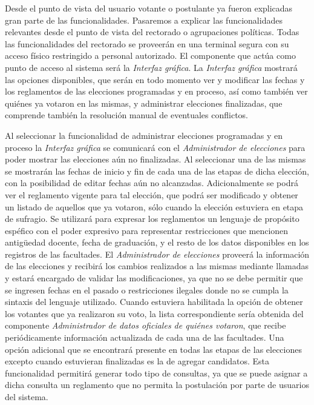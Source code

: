 


Desde el punto de vista del usuario votante o postulante ya fueron explicadas gran parte de las funcionalidades. Pasaremos a explicar las funcionalidades relevantes desde el punto de vista del rectorado o agrupaciones políticas. 
Todas las funcionalidades del rectorado se proveerán en una terminal segura con su acceso físico restringido a personal autorizado. El componente que actúa como punto de acceso al sistema será la \emph{Interfaz gráfica}. 
La \emph{Interfaz gráfica} mostrará las opciones disponibles, que serán en todo momento ver y modificar las fechas y los reglamentos de las elecciones programadas y en proceso, así como también ver quiénes ya votaron en las mismas, y administrar elecciones finalizadas, que comprende también la resolución manual de eventuales conflictos.


Al seleccionar la funcionalidad de administrar elecciones programadas y en proceso la \emph{Interfaz gráfica} se comunicará con el \emph{Administrador de elecciones} para poder mostrar las elecciones aún no finalizadas. Al seleccionar una de las mismas se mostrarán las fechas de inicio y fin de cada una de las etapas de dicha elección, con la posibilidad de editar fechas aún no alcanzadas. Adicionalmente se podrá ver el reglamento vigente para tal elección, que podrá ser modificado y obtener un listado de aquellos que ya votaron, sólo cuando la elección estuviera en etapa de sufragio. Se utilizará para expresar los reglamentos un lenguaje de propósito espéfico con el poder expresivo para representar restricciones que mencionen antig\"uedad docente, fecha de graduación, y el resto de los datos disponibles en los registros de las facultades. El \emph{Administrador de elecciones} proveerá la información de las elecciones y recibirá los cambios realizados a las mismas mediante llamadas y estará encargado de validar las modificaciones, ya que no se debe permitir que se ingresen fechas en el pasado o restricciones ilegales donde no se cumpla la sintaxis del lenguaje utilizado. Cuando estuviera habilitada la opción de obtener los votantes que ya realizaron su voto, la lista correspondiente sería obtenida del componente \emph{Administrador de datos oficiales de quiénes votaron}, que recibe periódicamente información actualizada de cada una de las facultades. Una opción adicional que se encontrará presente en todas las etapas de las elecciones excepto cuando estuvieran finalizadas es la de agregar candidatos. Esta funcionalidad permitirá generar todo tipo de consultas, ya que se puede asignar a dicha consulta un reglamento que no permita la postulación por parte de usuarios del sistema. 


